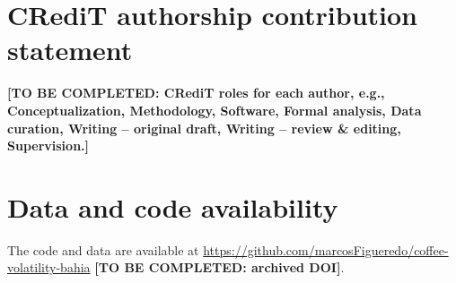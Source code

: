 \documentclass[11pt,a4paper]{article}
\begin{document}
\section*{CRediT authorship contribution statement}
\textbf{[TO BE COMPLETED: CRediT roles for each author, e.g., Conceptualization, Methodology, Software, Formal analysis, Data curation, Writing -- original draft, Writing -- review \& editing, Supervision.]}

\section*{Data and code availability}
The code and data are available at \url{https://github.com/marcosFigueredo/coffee-volatility-bahia} \textbf{[TO BE COMPLETED: archived DOI]}.
\end{document}
